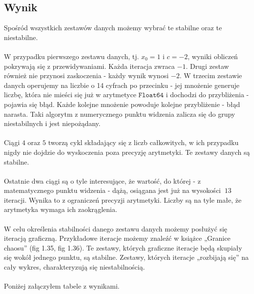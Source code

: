 \subsection{Wynik}
Spośród wszystkich zestawów danych możemy wybrać te stabilne oraz te niestabilne. \\\\
W przypadku pierwszego zestawu danych, tj. $ x_0 = 1 $ i $ c = -2 $, wyniki obliczeń pokrywają się z przewidywaniami. Każda iteracja zwraca $ -1 $. Drugi zestaw również nie przynosi zaskoczenia - każdy wynik wynosi $ -2 $. W trzecim zestawie danych operujemy na liczbie o 14 cyfrach po przecinku - jej mnożenie generuje liczbę, która nie mieści się już w arytmetyce $ \mathtt{Float64} $ i dochodzi do przybliżenia - pojawia się błąd. Każde kolejne mnożenie powoduje kolejne przybliżenie - błąd narasta. Taki algorytm z numerycznego punktu widzenia zalicza się do grupy niestabilnych i jest niepożądany. \\\\
Ciągi $ 4 $ oraz $ 5 $ tworzą cykl składający się z liczb całkowitych, w ich przypadku nigdy nie dojdzie do wyskoczenia poza precyzję arytmetyki. Te zestawy danych są stabilne.\\\\
Ostatnie dwa ciągi są o tyle interesujące, że wartość, do której - z matematycznego punktu widzenia - dążą, osiągana jest już na wysokości $ ~13 $ iteracji. Wynika to z ograniczeń precyzji arytmetyki. Liczby są na tyle małe, że arytmetyka wymaga ich zaokrąglenia. \\\\
W celu określenia stabilności danego zestawu danych możemy posłużyć się iteracją graficzną. Przykładowe iteracje możemy znaleźć w książce „Granice chaosu” (fig 1.35, fig 1.36). Te zestawy, których graficzne iteracje będą skupiały się wokół jednego punktu, są stabilne. Zestawy, których iteracje „rozbijają się” na cały wykres, charakteryzują się niestabilnością. \\\\
Poniżej załączyłem tabele z wynikami.
\begin{center}
    
\end{center}